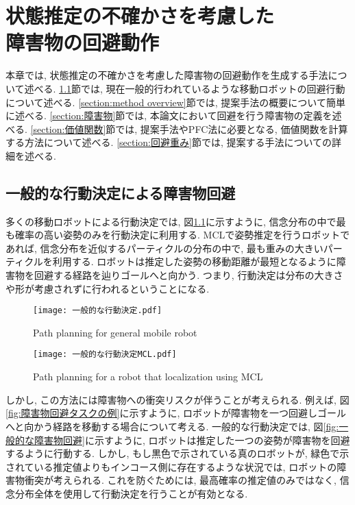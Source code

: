 \chapter{状態推定の不確かさを考慮した\\障害物の回避動作} \label{chapter:method}
本章では, 状態推定の不確かさを考慮した障害物の回避動作を生成する手法について述べる. 
\ref{section:一般的な回避}節では, 現在一般的行われているような移動ロボットの回避行動について述べる. 
\ref{section:method overview}節では, 提案手法の概要について簡単に述べる. 
\ref{section:障害物}節では, 本論文において回避を行う障害物の定義を述べる. 
\ref{section:価値関数}節では, 提案手法やPFC法に必要となる, 価値関数を計算する方法について述べる. 
\ref{section:回避重み}節では, 提案する手法についての詳細を述べる. 


\section{一般的な行動決定による障害物回避} \label{section:一般的な回避}
多くの移動ロボットによる行動決定では, 図\ref{fig:一般的な行動決定}に示すように, 
信念分布の中で最も確率の高い姿勢のみを行動決定に利用する. 
MCLで姿勢推定を行うロボットであれば, 信念分布を近似するパーティクルの分布の中で, 
最も重みの大きいパーティクルを利用する. 
ロボットは推定した姿勢の移動距離が最短となるように障害物を回避する経路を辿りゴールへと向かう. 
つまり, 行動決定は分布の大きさや形が考慮されずに行われるということになる. 

\begin{figure}[h]
  \begin{center}
    \texttt{[image: 一般的な行動決定.pdf]}
    \caption{Path planning for general mobile robot}
    \label{fig:一般的な行動決定}
  \end{center}
\end{figure}

\begin{figure}[h]
  \begin{center}
    \texttt{[image: 一般的な行動決定MCL.pdf]}
    \caption{Path planning for a robot that localization using MCL}
    \label{fig:一般的な行動決定MCL}
  \end{center}
\end{figure}

しかし, この方法には障害物への衝突リスクが伴うことが考えられる. 
例えば, 図\ref{fig:障害物回避タスクの例}に示すように, 
ロボットが障害物を一つ回避しゴールへと向かう経路を移動する場合について考える. 
一般的な行動決定では, 図\ref{fig:一般的な障害物回避}に示すように, ロボットは推定した一つの姿勢が障害物を回避するように行動する. 
しかし, もし黒色で示されている真のロボットが, 緑色で示されている推定値よりもインコース側に存在するような状況では, 
ロボットの障害物衝突が考えられる. 
これを防ぐためには, 最高確率の推定値のみではなく, 信念分布全体を使用して行動決定を行うことが有効となる. 


